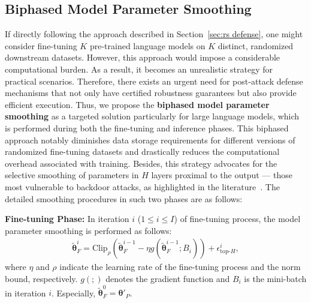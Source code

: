 \subsection{Biphased Model Parameter Smoothing}
\vspace{-1mm}
\label{sec: biphased model parameter smoothing}
If directly following the approach described in Section~\ref{sec:rs defense}, one might consider fine-tuning $K$ pre-trained language models on $K$ distinct, randomized downstream datasets. However, this approach would impose a considerable computational burden. As a result, it becomes an unrealistic strategy for practical scenarios. Therefore, there exists an urgent need for post-attack defense mechanisms that not only have certified robustness guarantees but also provide efficient execution. Thus, we propose the \textbf{biphased model parameter smoothing} as a targeted solution particularly for large language models, which is performed during both the fine-tuning and inference phases. This biphased approach notably diminishes data storage requirements for different versions of randomized fine-tuning datasets and drastically reduces the computational overhead associated with training. Besides, this strategy advocates for the selective smoothing of parameters in $H$ layers proximal to the output — those most vulnerable to backdoor attacks, as highlighted in the literature~\citep{kurita2020weight}. The detailed smoothing procedures in such two phases are as follows:

\textbf{Fine-tuning Phase:} In iteration $i$ ($1 \leq i \leq I$) of fine-tuning process, the model parameter smoothing is performed as follows:
\begin{equation}
\begin{aligned}
\tilde{\mathbf{\theta}}_F^{i} = \text{Clip}_{\rho}(\tilde{\mathbf{\theta}}^{i-1}_F - \eta g(\tilde{\mathbf{\theta}}^{i-1}_F; B_i)) + \epsilon^{i}_{\text{top-}H}, %
\end{aligned}
\label{eq: fine-tuning parameter smoothing}
\end{equation}
where $\eta$ and $\rho$ indicate the learning rate of the fine-tuning process and the norm bound, respectively. $g(;)$ denotes the gradient function and $B_i$ is the mini-batch in iteration $i$. Especially, $\tilde{\mathbf{\theta}}^{0}_F = \mathbf{\theta}'_P$.

